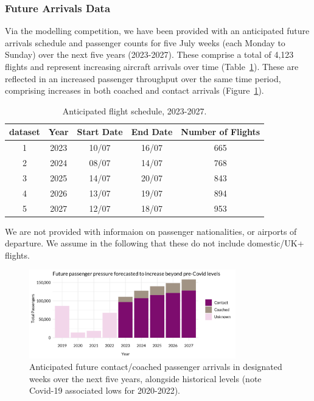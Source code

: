 \documentclass[10pt]{article}
\begin{document}
\subsubsection{Future Arrivals Data} \label{sec:future_arrivals_data}
Via the modelling competition, we have been provided with an anticipated future arrivals schedule and passenger counts for five July weeks (each Monday to Sunday) over the next five years (2023-2027). These comprise a total of 4,123 flights and represent increasing aircraft arrivals over time (Table~\ref{tab:future_arrivals_overview}). These are reflected in an increased passenger throughput over the same time period, comprising increases in both coached and contact arrivals (Figure~\ref{fig:future_passenger_burden}).
\begin{table}[!ht]
\caption{Anticipated flight schedule, 2023-2027.}
\label{tab:future_arrivals_overview}
\centering
\begin{tabular}{ccccc}
\hline
\multicolumn{1}{c}{\textbf{dataset}} & \textbf{Year} & \textbf{Start Date} & \textbf{End Date} & \textbf{Number of Flights} \\ \hline
1  & 2023  & 10/07  & 16/07     & 665   \\
2  & 2024  & 08/07  & 14/07     & 768   \\
3  & 2025  & 14/07  & 20/07     & 843   \\
4  & 2026  & 13/07  & 19/07     & 894   \\
5  & 2027  & 12/07  & 18/07     & 953   \\ \hline
\end{tabular}
\end{table}
We are not provided with informaion on passenger nationalities, or airports of departure. We assume in the following that these do not include domestic/UK+ flights. 

\begin{figure}[!ht]
    \centering
    \includegraphics[width=0.8\textwidth]{figures/future_passenger_burden_fig.png}
     \caption{Anticipated future contact/coached passenger arrivals in designated weeks over the next five years, alongside historical levels (note Covid-19 associated lows for 2020-2022).} \label{fig:future_passenger_burden}
\end{figure}
\end{document}
